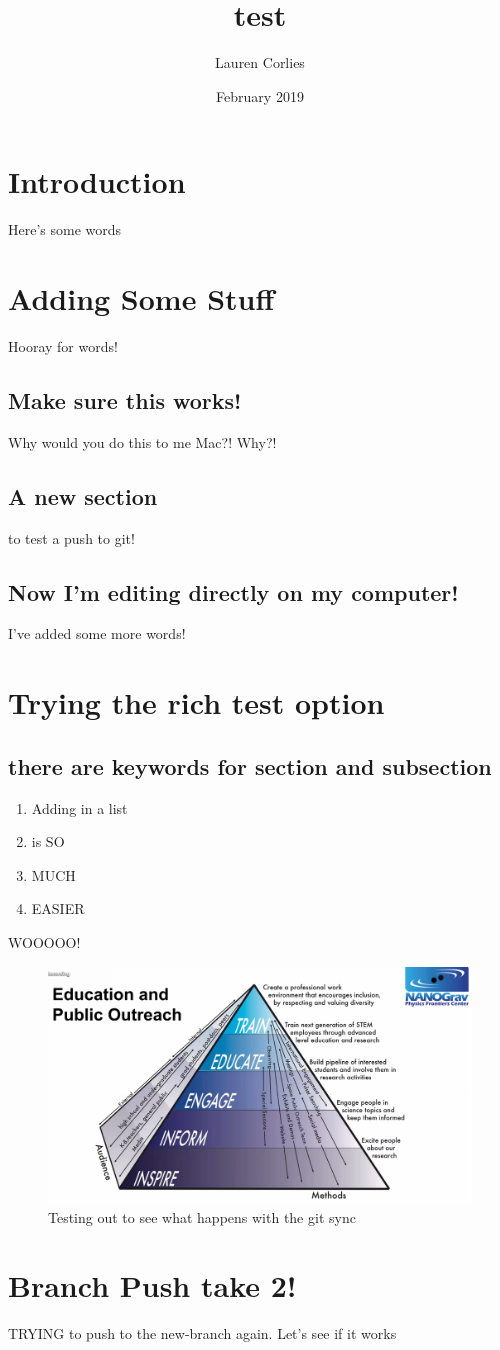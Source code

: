 \documentclass{article}
\title{test}
\author{Lauren Corlies}
\date{February 2019}
\begin{document}
\maketitle

\section{Introduction}
Here's some words

\section{Adding Some Stuff}
Hooray for words!

\subsection{Make sure this works!}
Why would you do this to me Mac?! Why?!

\subsection{A new section}
to test a push to git!

\subsection{Now I'm editing directly on my computer!}
I've added some more words!

\section{Trying the rich test option}
\subsection{there are keywords for section and subsection}
\begin{enumerate}
\item Adding in a list
\item is SO 
\item MUCH
\item EASIER
\end{enumerate}

WOOOOO!

\begin{figure}
    \centering
    \includegraphics[width=1.0\textwidth]{first_figure.png}
    \caption{Testing out to see what happens with the git sync}
    \label{fig:first}
\end{figure}

\section{Branch Push take 2!}
TRYING to push to the new-branch again. Let's see if it works
\end{document}
